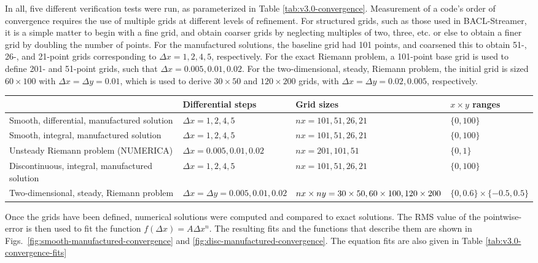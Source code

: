 In all, five different verification tests were run, as parameterized in Table \ref{tab:v3.0-convergence}. Measurement of a code's order of convergence requires the use of multiple grids at different levels of refinement. For structured grids, such as those used in BACL-Streamer, it is a simple matter to begin with a fine grid, and obtain coarser grids by neglecting multiples of two, three, etc. or else to obtain a finer grid by doubling the number of points. For the manufactured solutions, the baseline grid had 101 points, and coarsened this to obtain 51-, 26-, and 21-point grids corresponding to $\Delta x=1,2,4,5$, respectively. For the exact Riemann problem, a 101-point base grid is used to define 201- and 51-point grids, such that $\Delta x = 0.005, 0.01, 0.02$. For the two-dimensional, steady, Riemann problem, the initial grid is sized $60\times100$ with $\Delta x=\Delta y=0.01$, which is used to derive $30\times50$ and $120\times200$ grids, with $\Delta x=\Delta y=0.02,0.005$, respectively. 

\begin{tabular}[]{|p{1.7in}|p{1.2in}|p{1.43in}|p{.8in}|}
\label{tab:v3.0-convergence}
 & Differential steps & Grid sizes & $x \times y$ ranges\\
\hline

Smooth, differential, manufactured solution & $\Delta x=1, 2, 4, 5$&
$nx = 101, 51 ,26 ,21$& $\{0, 100\}$\\
\hline

Smooth, integral, manufactured solution & $\Delta x = 1, 2, 4, 5$&
$nx=101, 51, 26, 21$&$\{0, 100\}$\\
\hline

Unsteady Riemann problem (NUMERICA)&$\Delta x = 0.005, 0.01, 0.02$&
$nx=201, 101, 51$&$\{0, 1\}$\\
\hline

Discontinuous, integral, manufactured solution & $\Delta x = 1, 2, 4, 5$ &
$nx=101, 51, 26, 21$&$\{0, 100\}$\\
\hline

Two-dimensional, steady, Riemann problem&$\Delta x=\Delta y=0.005, 0.01, 0.02$&
$nx\times ny=30\times50, \newline 60\times100, 120\times200$&
$\{0, 0.6\}\times\{-0.5, 0.5\}$\\
\hline
\end{tabular}

Once the grids have been defined, numerical solutions were computed and compared to exact solutions. The RMS value of the pointwise-error is then used to fit the function $f\left(\Delta x\right)=A\Delta x^n$. The resulting fits and the functions that describe them are shown in Figs.~\ref{fig:smooth-manufactured-convergence} and \ref{fig:disc-manufactured-convergence}. The equation fits are also given in Table \ref{tab:v3.0-convergence-fits}


